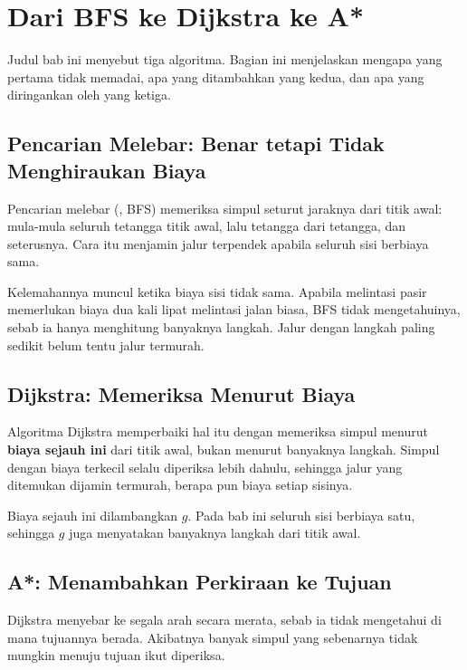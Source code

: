 \section{Dari BFS ke Dijkstra ke A*}
\label{sec:bfs-dijkstra-astar}

Judul bab ini menyebut tiga algoritma. Bagian ini menjelaskan mengapa yang
pertama tidak memadai, apa yang ditambahkan yang kedua, dan apa yang
diringankan oleh yang ketiga.

\subsection{Pencarian Melebar: Benar tetapi Tidak Menghiraukan Biaya}

Pencarian melebar (, BFS) memeriksa simpul
seturut jaraknya dari titik awal: mula-mula seluruh tetangga titik awal, lalu
tetangga dari tetangga, dan seterusnya. Cara itu menjamin jalur terpendek
apabila seluruh sisi berbiaya sama.

Kelemahannya muncul ketika biaya sisi tidak sama. Apabila melintasi pasir
memerlukan biaya dua kali lipat melintasi jalan biasa, BFS tidak
mengetahuinya, sebab ia hanya menghitung banyaknya langkah. Jalur dengan
langkah paling sedikit belum tentu jalur termurah.

\subsection{Dijkstra: Memeriksa Menurut Biaya}

Algoritma Dijkstra memperbaiki hal itu dengan memeriksa simpul menurut
\textbf{biaya sejauh ini} dari titik awal, bukan menurut banyaknya langkah.
Simpul dengan biaya terkecil selalu diperiksa lebih dahulu, sehingga jalur
yang ditemukan dijamin termurah, berapa pun biaya setiap sisinya.

Biaya sejauh ini dilambangkan $g$. Pada bab ini seluruh sisi berbiaya satu,
sehingga $g$ juga menyatakan banyaknya langkah dari titik awal.

\subsection{A*: Menambahkan Perkiraan ke Tujuan}

Dijkstra menyebar ke segala arah secara merata, sebab ia tidak mengetahui di
mana tujuannya berada. Akibatnya banyak simpul yang sebenarnya tidak mungkin
menuju tujuan ikut diperiksa.

